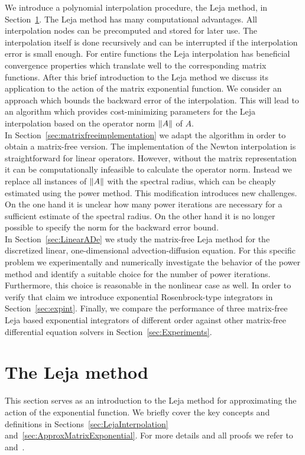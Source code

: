 \documentclass{scrartcl}
\begin{document}
	We introduce a polynomial interpolation procedure, the Leja method, in Section~\ref{sec:LejaMethod}. The Leja method has many computational advantages. All interpolation nodes can be precomputed and stored for later use. The interpolation itself is done recursively and can be interrupted if the interpolation error is small enough. For entire functions the Leja interpolation has beneficial convergence properties which translate well to the corresponding matrix functions. After this brief introduction to the Leja method we discuss its application to the action of the matrix exponential function. We consider an approach which bounds the backward error of the interpolation. This will lead to an algorithm which provides cost-minimizing parameters for the Leja interpolation based on the operator norm $\lVert A\rVert$ of $A$. \\
	In Section~\ref{sec:matrixfreeimplementation} we adapt the algorithm in order to obtain a matrix-free version. The implementation of the Newton interpolation is straightforward for linear operators. However, without the matrix representation it can be computationally infeasible to calculate the operator norm. Instead we replace all instances of $\lVert A\rVert$ with the spectral radius, which can be cheaply estimated using the power method. This modification introduces new challenges. On the one hand it is unclear how many power iterations are necessary for a sufficient estimate of the spectral radius. On the other hand it is no longer possible to specify the norm for the backward error bound. \\
	In Section~\ref{sec:LinearADe} we study the matrix-free Leja method for the discretized linear, one-dimensional advection-diffusion equation. For this specific problem we experimentally and numerically investigate the behavior of the power method and identify a suitable choice for the number of power iterations. Furthermore, this choice is reasonable in the nonlinear case as well. In order to verify that claim we introduce exponential Rosenbrock-type integrators in Section~\ref{sec:expint}. Finally, we compare the performance of three matrix-free Leja based exponential integrators of different order against other matrix-free differential equation solvers in Section~\ref{sec:Experiments}.
	

\section{The Leja method} \label{sec:LejaMethod}
	This section serves as an introduction to the Leja method for approximating the action of the exponential function. We briefly cover the key concepts and definitions in Sections~\ref{sec:LejaInterpolation} and~\ref{sec:ApproxMatrixExponential}. For more details and all proofs we refer to~\cite{advdif} and~\cite{lejarev}. 
	
\end{document}
